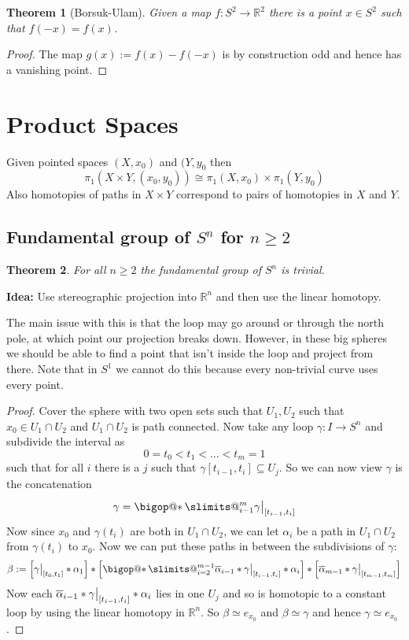 \documentclass[11pt]{article}
\makeatletter
\newcommand{\defeq}{:=}
\newcommand\restr[2]{{%
  \left.\kern-\nulldelimiterspace %
  #1 %
  \vphantom{\big|} %
  \right|_{#2} %
  }}
\DeclareRobustCommand\bigop[1]{%
  \mathop{\vphantom{\sum}\mathpalette\bigop@{#1}}\slimits@
}
\newcommand{\bigop@}[2]{%
  \vcenter{%
    \sbox\z@{$#1\sum$}%
    \hbox{\resizebox{\ifx#1\displaystyle.9\fi\dimexpr\ht\z@+\dp\z@}{!}{$\m@th#2$}}%
  }%
}
\newcommand{\bigast}{\DOTSB\bigop{\ast}}
\newcommand{\R}{\mathbb{R}}
\newtheorem{theorem}{Theorem}[section]
\makeatother
\begin{document}
\begin{theorem}[Borsuk-Ulam]
Given a map $f:S^2\to\R^2$ there is a point $x\in S^2$ such that $f(-x)=f(x)$.
\end{theorem}
\begin{proof}
The map $g(x)\defeq f(x) - f(-x)$ is by construction odd and hence has a vanishing point.
\end{proof}

\section{Product Spaces}
Given pointed spaces $(X, x_0)$ and $(Y, y_0$ then
\[
	\pi_1(X\times Y, (x_0, y_0))\cong \pi_1(X, x_0)\times\pi_1(Y,y_0)
\]
Also homotopies of paths in $X\times Y$ correspond to pairs of homotopies in $X$ and $Y$.

\subsection{Fundamental group of $S^n$ for $n\geq 2$}
\begin{theorem}
For all $n\geq 2$ the fundamental group of $S^n$ is trivial.
\end{theorem}
\textbf{Idea: }Use stereographic projection into $\R^n$ and then use the linear homotopy.

The main issue with this is that the loop may go around or through the north pole, at which point our projection breaks down.
However, in these big spheres we should be able to find a point that isn't inside the loop and project from there.
Note that in $S^1$ we cannot do this because every non-trivial curve uses every point.
\begin{proof}
Cover the sphere with two open sets such that $U_1, U_2$ such that $x_0\in U_1\cap U_2$ and $U_1\cap U_2$ is path connected.
Now take any loop $\gamma:I\to S^n$ and subdivide the interval as
\[
0= t_0 < t_1 < \dots < t_m = 1
\]
such that for all $i$ there is a $j$ such that $\gamma[t_{i-1}, t_i]\subseteq U_j$.
So we can now view $\gamma$ is the concatenation
\[
	\gamma=\bigast_{i-1}^m \restr{\gamma}{[t_{i-1}, t_i]}
\]
Now since $x_0$ and $\gamma(t_i)$ are both in $U_1\cap U_2$, we can let $\alpha_i$ be a path in $U_1\cap U_2$ from $\gamma(t_i)$ to $x_0$.
Now we can put these paths in between the subdivisions of $\gamma$:
\[
	\beta\defeq \left[\restr{\gamma}{[t_0, t_1]}\ast\alpha_1\right]\ast\left[\bigast_{i=2}^{m-1} \overline{\alpha}_{i-1}\ast\restr{\gamma}{[t_{i-1}, t_i]}\ast \alpha_i\right]\ast \left[\overline{\alpha}_{m-1}\ast\restr{\gamma}{[t_{m-1}, t_m]}\right]
\]
Now each $\overline{\alpha}_{i-1}\ast\restr{\gamma}{[t_{i-1}, t_i]}\ast\alpha_i$ lies in one $U_j$ and so is homotopic to a constant loop by using the linear homotopy in $\R^n$.
So $\beta\simeq e_{x_0}$ and $\beta\simeq\gamma$ and hence $\gamma\simeq e_{x_0}$.
\end{proof}
\end{document}
